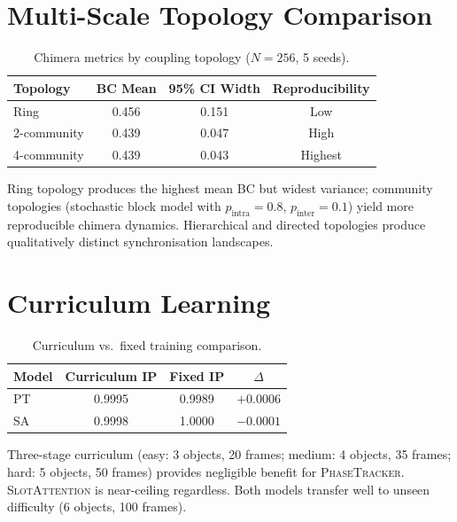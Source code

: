 \documentclass[11pt]{article}
\providecommand{\pt}{\textnormal{\textsc{PhaseTracker}}\xspace}
\providecommand{\sa}{\textnormal{\textsc{SlotAttention}}\xspace}
\begin{document}
\section{Multi-Scale Topology Comparison}
\label{app:topology}

\begin{table}[htbp]
\centering
\caption{Chimera metrics by coupling topology ($N{=}256$, 5 seeds).}
\label{tab:topology}
\begin{tabular}{lccc}
\toprule
Topology & BC Mean & 95\% CI Width & Reproducibility \\
\midrule
Ring          & 0.456 & 0.151 & Low \\
2-community   & 0.439 & 0.047 & High \\
4-community   & 0.439 & 0.043 & Highest \\
\bottomrule
\end{tabular}
\end{table}

Ring topology produces the highest mean BC but widest variance;
community topologies (stochastic block model with
$p_\text{intra} = 0.8$, $p_\text{inter} = 0.1$) yield more
reproducible chimera dynamics.  Hierarchical and directed topologies
produce qualitatively distinct synchronisation landscapes.

\section{Curriculum Learning}
\label{app:curriculum}

\begin{table}[htbp]
\centering
\caption{Curriculum vs.\ fixed training comparison.}
\label{tab:curriculum}
\begin{tabular}{lccc}
\toprule
Model & Curriculum IP & Fixed IP & $\Delta$ \\
\midrule
PT & 0.9995 & 0.9989 & $+0.0006$ \\
SA & 0.9998 & 1.0000 & $-0.0001$ \\
\bottomrule
\end{tabular}
\end{table}

Three-stage curriculum (easy: 3 objects, 20 frames; medium:
4 objects, 35 frames; hard: 5 objects, 50 frames) provides
negligible benefit for \pt.  \sa is near-ceiling regardless.
Both models transfer well to unseen difficulty (6 objects,
100 frames).
\end{document}
